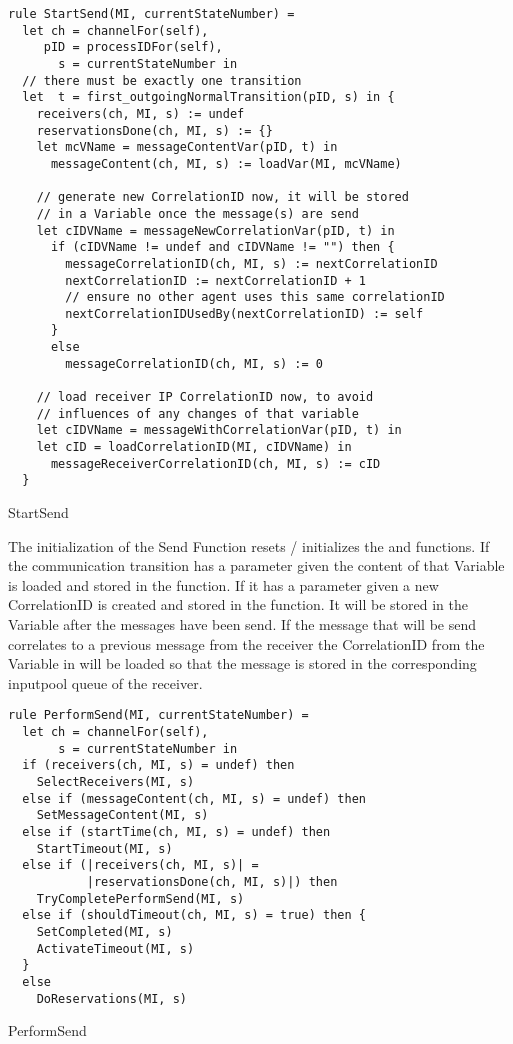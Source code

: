 \begin{listing}[H]
\begin{verbatim}
rule StartSend(MI, currentStateNumber) =
  let ch = channelFor(self),
     pID = processIDFor(self),
       s = currentStateNumber in
  // there must be exactly one transition
  let  t = first_outgoingNormalTransition(pID, s) in {
    receivers(ch, MI, s) := undef
    reservationsDone(ch, MI, s) := {}
    let mcVName = messageContentVar(pID, t) in
      messageContent(ch, MI, s) := loadVar(MI, mcVName)

    // generate new CorrelationID now, it will be stored
    // in a Variable once the message(s) are send
    let cIDVName = messageNewCorrelationVar(pID, t) in
      if (cIDVName != undef and cIDVName != "") then {
        messageCorrelationID(ch, MI, s) := nextCorrelationID
        nextCorrelationID := nextCorrelationID + 1
        // ensure no other agent uses this same correlationID
        nextCorrelationIDUsedBy(nextCorrelationID) := self
      }
      else
        messageCorrelationID(ch, MI, s) := 0

    // load receiver IP CorrelationID now, to avoid
    // influences of any changes of that variable
    let cIDVName = messageWithCorrelationVar(pID, t) in
    let cID = loadCorrelationID(MI, cIDVName) in
      messageReceiverCorrelationID(ch, MI, s) := cID
  }
\end{verbatim}
\caption{StartSend}
\label{lst:shortasm:StartSend}
\end{listing}


The initialization of the Send Function resets / initializes the  and
 functions.
If the communication transition has a  parameter given the
content of that Variable is loaded and stored in the 
function. If it has a  parameter given
a new CorrelationID is created and stored in the  function.
It will be stored in the Variable after the messages have been send.
If the message that will be send correlates to a previous message from the receiver
the CorrelationID from the Variable in  will be loaded
so that the message is stored in the corresponding inputpool queue of the receiver.


\begin{listing}[H]
\begin{verbatim}
rule PerformSend(MI, currentStateNumber) =
  let ch = channelFor(self),
       s = currentStateNumber in
  if (receivers(ch, MI, s) = undef) then
    SelectReceivers(MI, s)
  else if (messageContent(ch, MI, s) = undef) then
    SetMessageContent(MI, s)
  else if (startTime(ch, MI, s) = undef) then
    StartTimeout(MI, s)
  else if (|receivers(ch, MI, s)| =
           |reservationsDone(ch, MI, s)|) then
    TryCompletePerformSend(MI, s)
  else if (shouldTimeout(ch, MI, s) = true) then {
    SetCompleted(MI, s)
    ActivateTimeout(MI, s)
  }
  else
    DoReservations(MI, s)
\end{verbatim}
\caption{PerformSend}
\label{lst:shortasm:PerformSend}
\end{listing}


